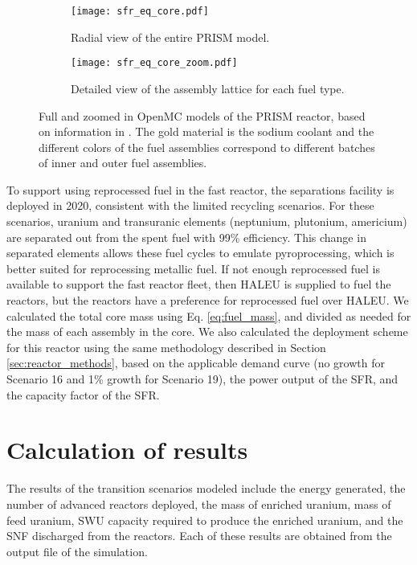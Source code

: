 \begin{figure}[h!]
    \centering
    \begin{subfigure}[b]{0.48\textwidth}
        \centering
        \texttt{[image: sfr\_eq\_core.pdf]}
        \caption{Radial view of the entire PRISM model.}
        \label{fig:prism_lattice}
    \end{subfigure}
    \hfill
    \begin{subfigure}[b]{0.48\textwidth}
        \centering
        \texttt{[image: sfr\_eq\_core\_zoom.pdf]}
        \caption{Detailed view of the assembly lattice for each 
        fuel type.}
        \label{fig:prism_lattice_zoom}
    \end{subfigure}
    \hfill            
    \caption{Full and zoomed in OpenMC models of the PRISM reactor, based 
    on information in \protect\cite{triplett_prism:_2012,fichtlscherer_assessing_2019}. 
    The gold material is the sodium coolant and the different 
    colors of the fuel assemblies correspond to different batches 
    of inner and outer fuel assemblies. }
    \label{fig:prism_model}
\end{figure}

To support using reprocessed fuel in the fast reactor, 
the separations facility is deployed in 2020, consistent with the 
limited recycling scenarios. For these scenarios, uranium and 
transuranic elements (neptunium, plutonium, americium) are separated 
out from 
the spent fuel with 99\% efficiency. This change in separated elements 
allows these fuel cycles to emulate pyroprocessing, which is better suited 
for reprocessing metallic fuel.
If not enough reprocessed fuel is 
available to support the fast reactor fleet, then \gls{HALEU} is supplied
to fuel the reactors, but the reactors have a preference for reprocessed 
fuel over \gls{HALEU}. We calculated the total core mass using Eq. 
\ref{eq:fuel_mass},
and divided as needed for the mass of each assembly in the core. 
We also calculated the deployment scheme for this reactor using the 
same methodology described in Section \ref{sec:reactor_methods}, based on 
the applicable demand curve (no growth for Scenario 16 and 1\% growth 
for Scenario 19), the power output of the \gls{SFR}, and the capacity 
factor of the \gls{SFR}.

\section{Calculation of results} \label{sec:results_calc}
The results of the transition scenarios modeled include the energy generated, 
the number of advanced reactors deployed, the mass of enriched uranium, 
mass of feed uranium, \gls{SWU} capacity required to produce the enriched 
uranium, and the \gls{SNF} discharged from the reactors. Each of these results 
are obtained from the \Cyclus output file of the simulation. 

